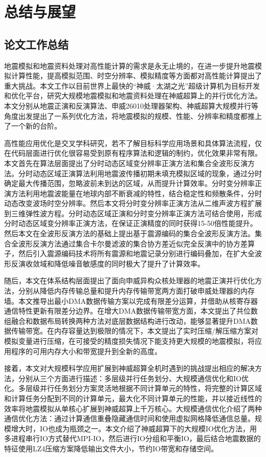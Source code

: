 \chapter{总结与展望} %
\label{ch:总结与展望}

\section{论文工作总结}

地震模拟和地震资料处理对高性能计算的需求是永无止境的，在进一步提升地震模拟计算性能，提高模拟范围、时空分辨率、模拟精度等方面都对高性能计算提出了重大挑战。本文工作以目前世界上最快的“神威·太湖之光”超级计算机为目标开发和优化平台，研究大规模地震模拟和地震资料处理在神威超算上的并行优化方法。本文分别从地震正演和反演算法、申威26010处理器架构、神威超算大规模并行等角度出发提出了一系列优化方法，将地震模拟的规模、性能、分辨率和精度都推上了一个新的台阶。

高性能应用优化是交叉学科研究，若不了解目标科学应用场景和具体算法流程，仅在代码层面进行优化很容易受到原有程序算法和逻辑的制约，优化效果非常有限。本文首先在算法层面提出了分时动态区域变分辨率正演方法和集合全波形反演方法。分时动态区域正演算法利用地震波传播初期未填充模拟区域的现象，通过分时确定最大传播范围，忽略波前未到达的区域，从而提升计算效率。分时变分辨率正演方法利用地震波能量在地球内部不断衰减的特性，结合稳定性和频散条件，分时动态改变波场时空分辨率。然后本文将分时变分辨率正演方法从二维声波方程扩展到三维弹性波方程。分时动态区域正演和分时变分辨率正演方法可结合使用，形成分时动态区域变分辨率正演方法，在保证正演精度的同时获得15-50倍性能提升。然后本文在全波形反演方法的基础上提出基于震源编码的集合全波形反演方法。集合全波形反演方法通过集合卡尔曼滤波的集合协方差近似完全反演中的协方差算子，然后引入震源编码技术将所有震源和地震记录分别进行编码叠加，在扩大全波形反演收敛域和降低噪音敏感度的同时极大了提升了计算效率。

随后，本文在体系结构层面提出了面向申威异构众核处理器的地震正演并行优化方法，分别从降低内存传输总量和提升内存传输带宽两方面打破申威处理器的内存墙。本文推导出最小DMA数据传输方案以完成有限差分运算，并借助从核寄存器通信特性更新有限差分边界。在增大DMA数据传输带宽方面，本文提出了共位数组融合和数据布局转换两种方法对底层数据结构进行改动，能够显著提升DMA数据传输带宽。在内存容量达到极限的情况下，本文提出了实时压缩/解压缩方案对模拟变量进行压缩，在可接受的精度损失情况下能支持更大规模的地震模拟，将应用程序的可用内存大小和带宽提升到全新的高度。

接着，本文对大规模科学应用扩展到神威超算全机时遇到的挑战提出相应的解决方法，分别从三个方面进行描述：多层级并行任务划分、大规模通信优化和IO优化。多层级并行任务划分方案灵活地根据不同计算单元的特性，将完整的计算区域和计算任务分配到不同的计算单元，最大化不同计算单元的性能，并以接近线性的效率将地震模拟从单核心扩展到神威超算上千万核心。大规模通信优化介绍了两种通信优化方法：通过计算通信重叠隐藏通信时间和使用虚拟网格降低通信总量。规模增大时，IO也成为瓶颈之一。本文介绍了神威超算下的大规模IO优化方法，用多进程串行IO方式替代MPI-IO，然后进行IO分组和平衡IO，最后结合地震数据的特征使用LZ4压缩方案降低输出文件大小，节约IO带宽和存储空间。

